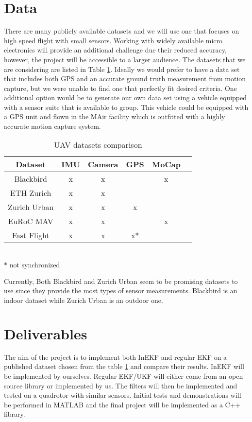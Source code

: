 \documentclass{IEEEtran}
\begin{document}
\section{Data}
There are many publicly available datasets and we will use one that focuses on high speed flight with small sensors.  Working with widely available micro electronics will provide an additional challenge due their reduced accuracy, however, the project will be accessible to a larger audience. The datasets that we are considering are listed in Table \ref{tab:data}.  Ideally we would prefer to have a data set that includes both GPS and an accurate ground truth measurement from motion capture, but we were unable to find one that perfectly fit desired criteria.  One additional option would be to generate our own data set using a vehicle equipped with a sensor suite that is available to group.  This vehicle could be equipped with a GPS unit and flown in the MAir facility which is outfitted with a highly accurate motion capture system.
\begin{table}[h]
    \centering
    \caption{UAV datasets comparison}\label{tab:data}
    \begin{tabular}{c|ccccc}\hline
        Dataset & IMU & Camera &  GPS & MoCap\\\hline
        Blackbird \cite{antonini2018blackbird} & x & x &  & x\\
        ETH Zurich\cite{ETHZ_DroneRacing} &  x & x &  &   \\
        Zurich Urban \cite{majdik2017zurich}&x & x & x & \\
        EuRoC MAV\cite{burri2016euroc} & x & x & &x\\
        Fast Flight\cite{sun2018robust}&x & x & x* &\\\hline
    \end{tabular}\\
    {\small$*$ not synchronized}
\end{table}
Currently, Both Blackbird and Zurich Urban seem to be promising datasets to use since they provide the most types of sensor measurements. Blackbird is an indoor dataset while Zurich Urban is an outdoor one.
%
\section{Deliverables}
The aim of the project is to implement both InEKF and regular EKF on a published dataset chosen from the table \ref{tab:data} and compare their results. InEKF will be implemented by ourselves. Regular EKF/UKF will either come from an open source library or implemented by us. The filters will then be implemented and tested on a quadrotor with similar sensors. Initial tests and demonstrations will be performed in MATLAB and the final project will be implemented as a C++ library.
%
\end{document}
